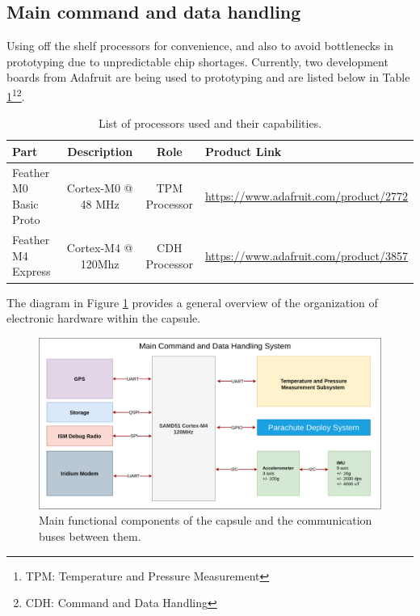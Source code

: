\documentclass{article}
\begin{document}
\subsection{Main command and data handling}

Using off the shelf processors for convenience, and also to avoid bottlenecks in prototyping due to unpredictable chip shortages. Currently, two development boards from Adafruit are being used to prototyping and are listed below in Table \ref{tab:processors}\footnote{TPM: Temperature and Pressure Measurement}\footnote{CDH: Command and Data Handling}.

\begin{table}[h!]	
	\caption{List of processors used and their capabilities.}
	\begin{tabular}{l | c c m{5cm}}
		Part & Description & Role & Product Link \\
		\hline
		Feather M0 Basic Proto & Cortex-M0 @ 48 MHz & TPM Processor & \url{https://www.adafruit.com/product/2772}\\
		Feather M4 Express & Cortex-M4 @ 120Mhz & CDH Processor & \url{https://www.adafruit.com/product/3857} 
	\end{tabular}
	\label{tab:processors}
\end{table}

The diagram in Figure \ref{fig:main-overview} provides a general overview of the organization of electronic hardware within the capsule. 
\begin{figure}[h!]
	\centering
	\includegraphics[width=\textwidth]{images/amtps-main-system.png}
	\caption{Main functional components of the capsule and the communication buses between them.}
	\label{fig:main-overview}
\end{figure}


\end{document}
